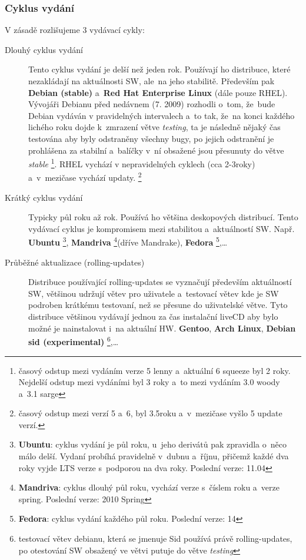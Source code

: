 \documentclass[a4paper,12pt]{article}
\renewcommand{\b}[1]{\textbf{#1}} %
\renewcommand{\it}[1]{\textit{#1}}		%
\begin{document}
\subsubsection{Cyklus vydání}
V zásadě rozlišujeme 3 vydávací cykly:
\begin{description}
 \item[Dlouhý cyklus vydání] Tento cyklus vydání je delší než jeden rok. Používají ho distribuce, které nezakládají na aktuálnosti SW, ale~na jeho stabilitě. Především pak \b{Debian (stable)} a~\b{Red Hat Enterprise Linux} (dále pouze RHEL). Vývojáři Debianu před nedávnem (7. 2009) rozhodli o~tom, že~bude Debian vydáván v pravidelných intervalech a~to tak, že~na konci každého lichého roku dojde k~zmrazení větve \it{testing}, ta je následně nějaký čas testována aby byly odstraněny všechny bugy, po jejich odstranění je prohlášena za stabilní a~balíčky v~ní obsažené jsou přesunuty do větve \it{stable}
\footnote{časový odstup mezi vydáním verze 5 lenny a~aktuální 6 squeeze byl 2 roky. Nejdelší odstup mezi vydáními byl 3 roky a~to mezi vydáním 3.0 woody a~3.1 sarge}. RHEL vychází v nepravidelných cyklech (cca 2-3roky) a~v~mezičase vychází updaty. 
\footnote{časový odstup mezi verzí 5 a~6, byl 3.5roku a~v~mezičase vyšlo 5 update verzí.}
 \item[Krátký cyklus vydání] Typicky půl roku až rok. Používá ho většina deskopových distribucí. Tento vydávací cyklus je kompromisem mezi stabilitou a~aktuálností SW. Např. \b{Ubuntu}
\footnote{\b{Ubuntu}: cyklus vydání je půl roku, u~jeho derivátů pak zpravidla o~něco málo delší. Vydaní probíhá pravidelně v~dubnu a~říjnu, přičemž každé dva roky vyjde LTS verze s~podporou na dva roky. Poslední verze: 11.04}, \b{Mandriva} 
\footnote{\b{Mandriva}: cyklus dlouhý půl roku, vychází verze s~číslem roku a~verze spring. Poslední verze: 2010 Spring}(dříve Mandrake), \b{Fedora} 
\footnote{\b{Fedora}: cyklus vydání každého půl roku. Poslední verze: 14},…
 \item[Průběžné aktualizace (rolling-updates)] Distribuce používající rolling-updates se vyznačují především aktuálností SW, většinou udržují větev pro uživatele a~testovací větev kde je SW podroben krátkému testovaní, než se přesune do uživatelské větve. Tyto distribuce většinou vydávají jednou za čas instalační liveCD aby bylo možné je nainstalovat i~na aktuální HW. \b{Gentoo}, \b{Arch Linux}, \b{Debian sid (experimental)}
\footnote{testovací větev debianu, která se jmenuje Sid používá právě rolling-updates, po otestování SW obsažený ve větvi putuje do větve \it{testing}},…
 \end{description}
\end{document}
